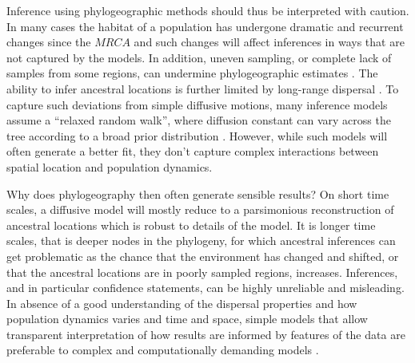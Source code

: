 \documentclass[aps,rmp, twocolumn]{revtex4}
\begin{document}
Inference using phylogeographic methods should thus be interpreted with caution.
In many cases the habitat of a population has undergone dramatic and recurrent changes since the $MRCA$ and such changes will affect inferences in ways that are not captured by the models.
In addition, uneven sampling, or complete lack of samples from some regions, can undermine phylogeographic estimates \citep{kalkauskas_sampling_2021}.
The ability to infer ancestral locations is further limited by long-range dispersal \citep{hallatschek_acceleration_2014}.
To capture such deviations from simple diffusive motions, many inference models assume a ``relaxed random walk'', where diffusion constant can vary across the tree according to a broad prior distribution \citep{dellicour_relax_2021}.
However, while such models will often generate a better fit, they don't capture complex interactions between spatial location and population dynamics.

Why does phylogeography then often generate sensible results?
On short time scales, a diffusive model will mostly reduce to a parsimonious reconstruction of ancestral locations which is robust to details of the model.
It is longer time scales, that is deeper nodes in the phylogeny, for which ancestral inferences can get problematic as the chance that the environment has changed and shifted, or that the ancestral locations are in poorly sampled regions, increases.
Inferences, and in particular confidence statements, can be highly unreliable and misleading.
In absence of a good understanding of the dispersal properties and how population dynamics varies and time and space, simple models that allow transparent interpretation of how results are informed by features of the data are preferable to complex and computationally demanding models \citep{layan_impact_2023}.




\end{document}

